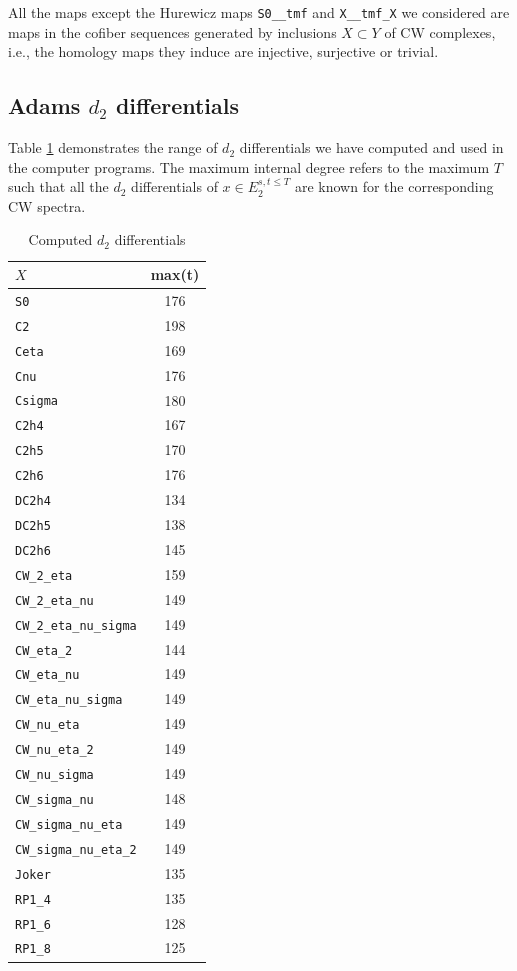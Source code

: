 \documentclass{amsart}
\numberwithin{equation}{section}
\begin{document}
All the maps except the Hurewicz maps \verb|S0__tmf| and \verb|X__tmf_X| we considered are maps in the cofiber sequences generated by inclusions $X\subset Y$ of CW complexes, i.e., the homology maps they induce are injective, surjective or trivial.

\subsection{Adams $d_2$ differentials}
Table \ref{tb:d2} demonstrates the range of $d_2$ differentials we have computed and used in the computer programs. The maximum internal degree refers to the maximum $T$ such that all the $d_2$ differentials of $x\in E_2^{s,t\le T}$ are known for the corresponding CW spectra.
\begin{table}
\begin{tabular}{|l|c|}\hline
$X$ & max(t)\\\hline
\verb|S0| & 176 \\\hline
\verb|C2| & 198 \\\hline
\verb|Ceta| & 169 \\\hline
\verb|Cnu| & 176 \\\hline
\verb|Csigma| & 180 \\\hline
\verb|C2h4| & 167 \\\hline
\verb|C2h5| & 170 \\\hline
\verb|C2h6| & 176 \\\hline
\verb|DC2h4| & 134 \\\hline
\verb|DC2h5| & 138 \\\hline
\verb|DC2h6| & 145 \\\hline
\verb|CW_2_eta| & 159 \\\hline
\verb|CW_2_eta_nu| & 149 \\\hline
\verb|CW_2_eta_nu_sigma| & 149 \\\hline
\verb|CW_eta_2| & 144 \\\hline
\verb|CW_eta_nu| & 149 \\\hline
\verb|CW_eta_nu_sigma| & 149 \\\hline
\verb|CW_nu_eta| & 149 \\\hline
\verb|CW_nu_eta_2| & 149 \\\hline
\verb|CW_nu_sigma| & 149 \\\hline
\verb|CW_sigma_nu| & 148 \\\hline
\verb|CW_sigma_nu_eta| & 149 \\\hline
\verb|CW_sigma_nu_eta_2| & 149 \\\hline
\verb|Joker| & 135 \\\hline
\verb|RP1_4| & 135 \\\hline
\verb|RP1_6| & 128 \\\hline
\verb|RP1_8| & 125 \\\hline
\end{tabular}\caption{Computed $d_2$ differentials}\label{tb:d2}
\end{table}\vspace{5pt}
\end{document}
